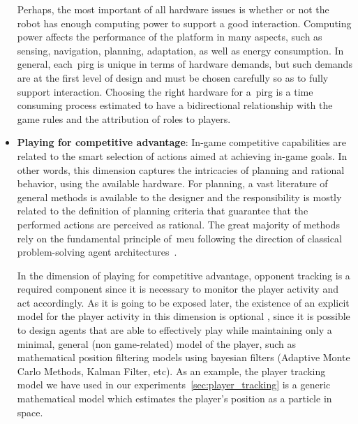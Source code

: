 \begin{itemize}[leftmargin=*,labelsep=5.8mm]
Perhaps, the most important of all hardware issues is whether or not the robot has enough computing power to support a good interaction. Computing power affects the performance of the platform in many aspects, such as sensing, navigation, planning, adaptation, as well as energy consumption. In general, each~\gls{pirg} is unique in terms of hardware demands, but such demands are at the first level of design and must be chosen carefully so as to fully support interaction. Choosing the right hardware for a~\gls{pirg} is a time consuming process estimated to have a bidirectional relationship with the game rules and the attribution of roles to players.

\item \textbf{Playing for competitive advantage}: In-game competitive capabilities are related to the smart selection of actions aimed at achieving in-game goals. In other words, this dimension captures the intricacies of planning and rational behavior, using the available hardware. %
For planning, a vast literature of general methods is available to the designer and the responsibility is mostly related to the definition of planning criteria that guarantee that the performed actions are perceived as rational. The great majority of methods rely on the fundamental principle of~\gls{meu} following the direction of classical problem-solving agent architectures~\citep{russell_artificial_2009}.

In the dimension of playing for competitive advantage, opponent tracking is a required component since it is necessary to monitor the player activity and act accordingly. As it is going to be exposed later, the existence of an explicit model for the player activity in this dimension is optional %
, since it is possible to design agents that are able to effectively play while maintaining only a minimal, general (non game-related) model of the player, such as mathematical position filtering models using bayesian filters (\eg Adaptive Monte Carlo Methods, Kalman Filter, etc). As an example, the player tracking model we have used in our experiments~\ref{sec:player_tracking} is a generic mathematical model which estimates the player's position as a particle in space. %


\end{itemize}

